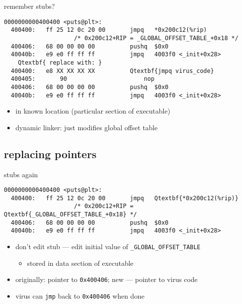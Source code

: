 \begin{frame}[fragile,label=stubReplace]{remember stubs?}
\begin{Verbatim}[commandchars=Q\{\},fontsize=\fontsize{8}{9}\selectfont]
0000000000400400 <puts@plt>:
  400400:	ff 25 12 0c 20 00    	jmpq   *0x200c12(%rip) 
                    /* 0x200c12+RIP = _GLOBAL_OFFSET_TABLE_+0x18 */
  400406:	68 00 00 00 00       	pushq  $0x0
  40040b:	e9 e0 ff ff ff       	jmpq   4003f0 <_init+0x28>
    Qtextbf{ replace with: }
  400400:	e8 XX XX XX XX          Qtextbf{jmpq virus_code}
  400405:       90                      nop
  400406:	68 00 00 00 00       	pushq  $0x0
  40040b:	e9 e0 ff ff ff       	jmpq   4003f0 <_init+0x28>
\end{Verbatim}
\begin{itemize}
    \item in known location (particular section of executable)
    \item dynamic linker: just modifies global offset table
\end{itemize}
\end{frame}


\subsection{replacing pointers}


\begin{frame}[fragile,label=stubsReplacePtr]{stubs again}
\begin{Verbatim}[commandchars=Q\{\},fontsize=\fontsize{8}{9}\selectfont]
0000000000400400 <puts@plt>:
  400400:	ff 25 12 0c 20 00    	jmpq   Qtextbf{*0x200c12(%rip)}
                    /* 0x200c12+RIP = Qtextbf{_GLOBAL_OFFSET_TABLE_+0x18} */
  400406:	68 00 00 00 00       	pushq  $0x0
  40040b:	e9 e0 ff ff ff       	jmpq   4003f0 <_init+0x28>
\end{Verbatim}
\begin{itemize}
\item don't edit stub --- edit initial value of {\tt \_GLOBAL\_OFFSET\_TABLE}
    \begin{itemize}
    \item stored in data section of executable
    \end{itemize}
\item originally: pointer to {\tt 0x400406}; new --- pointer to virus code
\item virus can {\tt jmp} back to {\tt 0x400406} when done
\end{itemize}
\end{frame}


